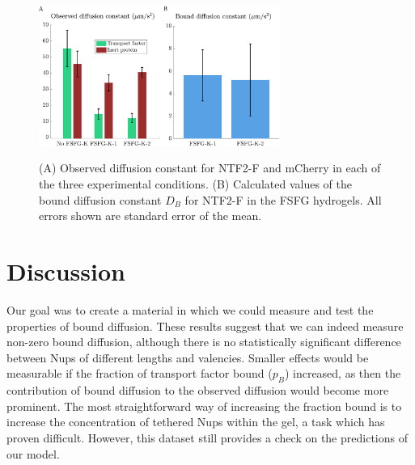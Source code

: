 \begin{figure}
\caption{(A) Observed diffusion constant for NTF2-F and mCherry in each of the three experimental conditions. (B) Calculated values of the bound diffusion constant $D_B$ for NTF2-F in the FSFG hydrogels.  All errors shown are standard error of the mean. \\}
\centering
\includegraphics[width=0.7\textwidth]{figs/ch04/bound-diffusion}
\label{fig:bound-diffusion}
\end{figure} 




\section{Discussion} 

Our goal was to create a material in which we could measure and test the properties of bound diffusion.  These results suggest that we can indeed measure non-zero bound diffusion, although there is no statistically significant difference between Nups of different lengths and valencies.  Smaller effects would be measurable if the fraction of transport factor bound ($p_B$) increased, as then the contribution of bound diffusion to the observed diffusion would become more prominent.  The most straightforward way of increasing the fraction bound is to increase the concentration of tethered Nups within the gel, a task which has proven difficult.  However, this dataset still provides a check on the predictions of our model.

